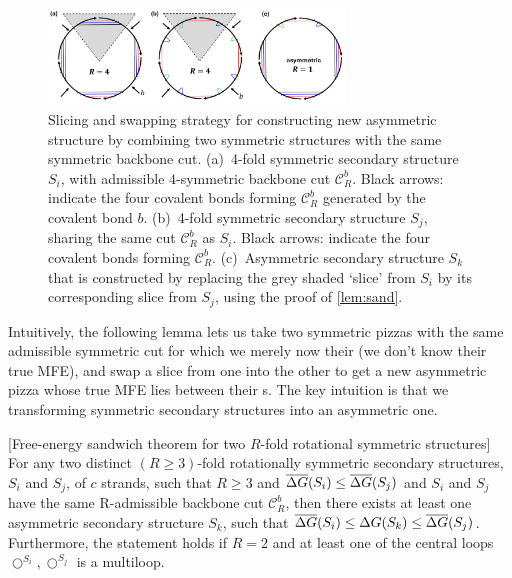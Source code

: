 \begin{figure}[t]
	\centering\includegraphics[width=0.7\textwidth]{figures/sand.jpg}
	\caption{Slicing and swapping strategy for constructing new asymmetric structure by combining two symmetric structures with the same symmetric backbone cut. 
		(a)~4-fold symmetric secondary structure $S_i$, with admissible $4$-symmetric backbone cut $\mathcal{C}_R^b$.
		Black arrows: indicate the four covalent bonds forming $\mathcal{C}_R^b$ generated by the covalent bond $b$. 
		(b)~4-fold symmetric secondary structure $S_j$, sharing the same cut $\mathcal{C}_R^b$ as $S_i$.
		Black arrows: indicate the four covalent bonds forming $\mathcal{C}_R^b$. 
		(c)~Asymmetric secondary structure $S_k$ that is constructed by replacing the grey shaded `slice' from $S_i$ by its corresponding slice from $S_j$, using the proof of  \cref{lem:sand}. 
	}\label{fig:sand}
\end{figure}



Intuitively, the following lemma lets us take two symmetric pizzas with the same admissible symmetric cut for which we merely now their \snMFE (we don't know their true MFE), and swap a slice from one into the other to get a new asymmetric pizza whose true MFE lies between their {\snMFE}s. The key intuition is that we transforming symmetric secondary structures into an  asymmetric one. 

\begin{lemma}\label{lem:sand}[Free-energy sandwich theorem for two $R$-fold rotational symmetric  structures]
	For any two distinct $(R \geq 3)$-fold rotationally symmetric secondary structures, $S_i$ and $S_j$, of $c$ strands, such that $R \geq 3$ and $\overline{\Delta G}(S_i) \leq \overline{\Delta G}(S_j)$ and $S_i$ and $S_j$ have the same R-admissible backbone cut $\mathcal{C}_R^b$, then there exists at least one asymmetric secondary structure $S_k$, such that $\overline{\Delta G}(S_i) \leq \Delta G(S_k) \leq \overline{\Delta G}(S_j)$.  Furthermore, the statement holds if $R=2$ and at least one of the central loops  $\bigcirc^{S_i},  \bigcirc^{S_j}$  is a multiloop. 
\end{lemma}

